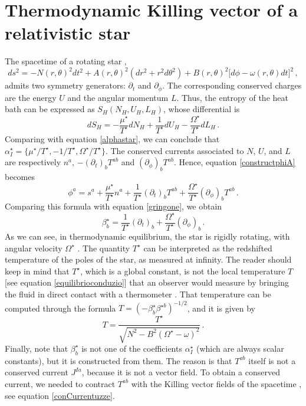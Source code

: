 \documentclass[a4paper, amsfonts, amssymb, amsmath, reprint, showkeys, nofootinbib, twoside, onecolumn, notitlepage]{revtex4-1}
\theoremstyle{definition}
\theoremstyle{theorem}
\begin{document}
\section{Thermodynamic Killing vector of a relativistic star}
\label{ThermoKilling}

The spacetime of a rotating star \cite{Gourgoulhon_intro_stars},
\begin{equation}
ds^2 = -N(r,\theta)^2 dt^2+A(r,\theta)^2(dr^2 +r^2 d\theta^2) +B(r,\theta)^2 \big[d\phi -\omega(r,\theta) dt \big]^2 \, ,
\end{equation}
admits two symmetry generators: $\partial_t$ and $\partial_\phi$. The corresponding conserved charges are the energy $U$ and the angular momentum $L$. Thus, the entropy of the heat bath can be expressed as $S_H(N_H,U_H,L_H)$, whose differential is \cite{GibbonsHawking1977}
\begin{equation}
dS_H = -\dfrac{\mu^\star}{T^\star} dN_H +\dfrac{1}{T^\star} dU_H -\dfrac{\Omega^\star}{T^\star} dL_H \, .
\end{equation}
Comparing with equation \eqref{alphastar}, we can conclude that $\alpha^\star_I=\{\mu^\star/T^\star,-1/T^\star,\Omega^\star/T^\star\}$. The conserved currents associated to $N$, $U$, and $L$ are respectively $n^a$, $- (\partial_t)_b T^{ab} $ and $(\partial_\phi)_b T^{ab}$. Hence, equation \eqref{constructphiA} becomes
\begin{equation}
\phi^a = s^a +\dfrac{\mu^\star}{T^\star} n^a +\dfrac{1}{T^\star} (\partial_t)_b T^{ab} +\dfrac{\Omega^\star}{T^\star} (\partial_\phi)_b T^{ab} \, .
\end{equation} 
Comparing this formula with equation \eqref{gringone}, we obtain
\begin{equation}
\beta^\star_b = \dfrac{1}{T^\star} (\partial_t)_b +\dfrac{\Omega^\star}{T^\star} (\partial_\phi)_b \, .
\end{equation}
As we can see, in thermodynamic equilibrium, the star is rigidly rotating, with angular velocity $\Omega^\star$ \cite{Gourgoulhon_intro_stars,Geo2020}. The quantity $T^\star$ can be interpreted as the redshifted temperature of the poles of the star, as measured at infinity. The reader should keep in mind that $T^\star$, which is a global constant, is not the local temperature $T$ [see equation \eqref{equilibrioconduzio}] that an observer would measure by bringing the fluid in direct contact with a thermometer \cite{GavassinoTermometri}. That temperature can be computed through the formula $T=(-\beta^\star_b \beta^{\star b})^{-1/2}$, and it is given by 
\begin{equation}
    T=\dfrac{T^\star}{\sqrt{N^2-B^2(\Omega^\star-\omega)^2}} \, .
\end{equation}
Finally, note that $\beta^\star_b$ is not one of the coefficients $\alpha^\star_I$ (which are always scalar constants), but it is constructed from them. The reason is that $T^{ab}$ itself is not a conserved current $J^{Ia}$, because it is not a vector field. To obtain a conserved current, we needed to contract $T^{ab}$ with the Killing vector fields of the spacetime \cite{Hawking1973}, see equation \eqref{conCurrentuzze}.



\label{lastpage}
\end{document}
